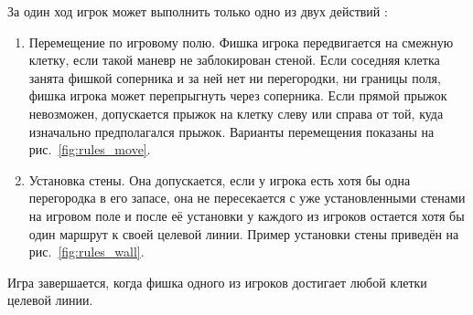\documentclass[a4paper,12pt]{diplom}
\begin{document}
За один ход игрок может выполнить только одно из двух действий \cite{hobbygamesRules}:

\begin{enumerate}

    \item Перемещение по игровому полю. Фишка игрока передвигается на смежную клетку, если такой маневр не заблокирован стеной. Если соседняя клетка занята фишкой соперника и за ней нет ни перегородки, ни границы поля, фишка игрока может перепрыгнуть через соперника. Если прямой прыжок невозможен, допускается прыжок на клетку слеву или справа от той, куда изначально предполагался прыжок. Варианты перемещения показаны на рис.~\ref{fig:rules_move}.
    \item Установка стены. Она допускается, если у игрока есть хотя бы одна перегородка в его запасе, она не пересекается с уже установленными стенами на игровом поле и после её установки у каждого из игроков остается хотя бы один маршрут к своей целевой линии. Пример установки стены приведён на рис.~\ref{fig:rules_wall}.

\end{enumerate}
Игра завершается, когда фишка одного из игроков достигает любой клетки целевой линии.
\end{document}
